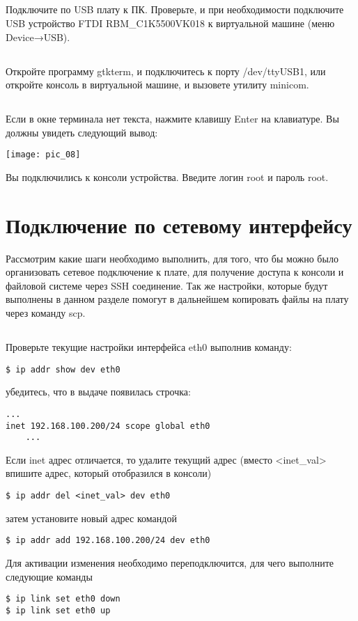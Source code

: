 \subsection{}Подключите по USB плату к ПК. Проверьте, и при необходимости подключите USB устройство FTDI RBM\_C1K5500VK018 к виртуальной машине (меню Device→USB).

\subsection{}Откройте программу gtkterm, и подключитесь к порту /dev/ttyUSB1, или откройте консоль в виртуальной машине, и вызовете утилиту minicom.

\subsection{}Если в окне терминала нет текста, нажмите клавишу Enter на клавиатуре. Вы должны увидеть следующий вывод:
\begin{center}
	\texttt{[image: pic\_08]}
\end{center}
Вы подключились к консоли устройства. Введите логин root и пароль root.

\section{Подключение по сетевому интерфейсу}

Рассмотрим какие шаги необходимо выполнить, для того, что бы можно было организовать сетевое подключение к плате, для получение доступа к консоли и файловой системе через SSH соединение. Так же настройки, которые будут выполнены в данном разделе помогут в дальнейшем копировать файлы на плату через команду scp.

\subsection{}Проверьте текущие настройки интерфейса eth0 выполнив команду: 
\begin{lstlisting}[style=bash]
$ ip addr show dev eth0 
\end{lstlisting}
убедитесь, что в выдаче появилась строчка: 
\begin{lstlisting}[style=stdout]
	...
inet 192.168.100.200/24 scope global eth0 
	...
\end{lstlisting}
Если inet адрес отличается, то удалите текущий адрес (вместо <inet\_val> впишите адрес, который отобразился в консоли)
\begin{lstlisting}[style=bash]
$ ip addr del <inet_val> dev eth0
\end{lstlisting}
затем установите новый адрес командой 
\begin{lstlisting}[style=bash]
$ ip addr add 192.168.100.200/24 dev eth0
\end{lstlisting} 
Для активации изменения необходимо переподключится, для чего выполните следующие команды
\begin{lstlisting}[style=bash]
$ ip link set eth0 down
$ ip link set eth0 up
\end{lstlisting} 

